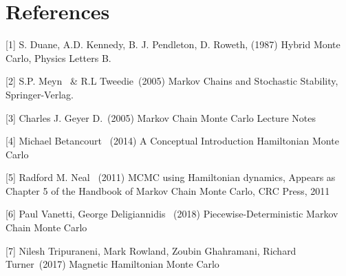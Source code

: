 \documentclass{article}
\begin{document}
\section*{References}


\small

[1] S. Duane, A.D. Kennedy, B. J. Pendleton, D. Roweth, (1987) Hybrid Monte Carlo, Physics Letters B.

[2] S.P. Meyn \ \& R.L Tweedie\ (2005) Markov Chains and Stochastic Stability, Springer-Verlag.

[3] Charles J. Geyer D.\ (2005) Markov Chain Monte Carlo Lecture Notes

[4] Michael Betancourt \ (2014) A Conceptual Introduction Hamiltonian Monte Carlo 

[5] Radford M. Neal \ (2011) MCMC using Hamiltonian dynamics, Appears as Chapter 5 of the Handbook of Markov Chain Monte Carlo, CRC Press, 2011

[6] Paul Vanetti, George Deligiannidis \ (2018) Piecewise-Deterministic Markov Chain Monte Carlo

[7] Nilesh Tripuraneni, Mark Rowland, Zoubin Ghahramani, Richard Turner\ (2017) Magnetic Hamiltonian Monte Carlo
\end{document}
